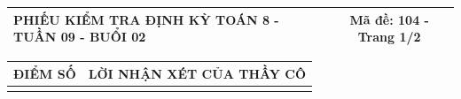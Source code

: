 \documentclass[12pt,a4paper]{article}
\begin{document}
\newpage
\noindent
\begin{tabularx}{\linewidth}{|X|c|}
\hline
\textbf{PHIẾU KIỂM TRA ĐỊNH KỲ TOÁN 8 - TUẦN 09 - BUỔI 02} & \textbf{Mã đề: 104 - Trang 1/2} \\
\hline
\end{tabularx}

\vspace{1.2mm}

\noindent
\begin{tabularx}{\linewidth}{|p{3.2cm}|X|}
\hline
\centering\textbf{ĐIỂM SỐ} & \centering\textbf{LỜI NHẬN XÉT CỦA THẦY CÔ} \tabularnewline
\hline
\rule{0pt}{1.8cm} & \tabularnewline
\hline
\end{tabularx}
\end{document}
